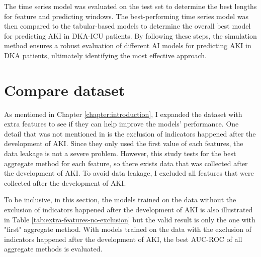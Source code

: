 \documentclass[../main.tex]{subfiles}
\begin{document}
The time series model was evaluated on the test set to determine the best lengths for feature and predicting windows.
The best-performing time series model was then compared to the tabular-based models to determine the overall best model for predicting AKI in DKA-ICU patients.
By following these steps, the simulation method ensures a robust evaluation of different AI models for predicting AKI in DKA patients, ultimately identifying the most effective approach.



\section{Compare dataset}

As mentioned in Chapter \ref{chapter:introduction}, I expanded the dataset with extra features to see if they can help improve the models' performance.
One detail that was not mentioned in  is the exclusion of indicators happened after the development of AKI.
Since they only used the first value of each features, the data leakage is not a severe problem.
However, this study tests for the best aggregate method for each feature, so there exists data that was collected after the development of AKI.
To avoid data leakage, I excluded all features that were collected after the development of AKI.

To be inclusive, in this section, the models trained on the data without the exclusion of indicators happened after the development of AKI is also illustrated in Table \ref{tab:extra-features-no-exclusion} but the valid result is only the one with "first" aggregate method.
With models trained on the data with the exclusion of indicators happened after the development of AKI, the best AUC-ROC of all aggregate methods is evaluated.
\end{document}
